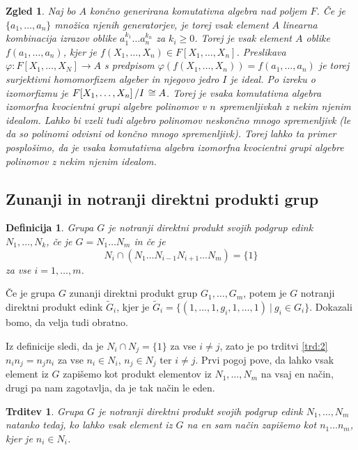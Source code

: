\documentclass[10pt, a4paper]{article}
\newtheorem{trditev}[izr]{Trditev}
\newtheorem{defi}{Definicija}[section]
\newenvironment{noticeB}{%
  \tcolorbox[%
  notitle,
  empty,
  enhanced,  %
  breakable,
  coltext=black,
  colback=white, 
  fontupper=\rmfamily,
  noparskip,
  sharp corners,
  boxrule=-1pt,  %
  frame hidden,
  left=7pt,  %
  right=7pt,
  top=5pt,
  bottom=5pt,
  before skip=2.5ex plus 2pt,
  after skip=2.5ex plus 2pt,
  borderline west = {1.5pt}{-0.1pt}{blue!30!black}, %
  overlay unbroken and last={%
    \draw[color=black, line width=1.25pt]
    ($(frame.south west)+(1.pt, -0.1pt)$) -- ++(2em, 0);
  }
  ]}
{\endtcolorbox}
\newenvironment{definicija}{\begin{noticeB}\begin{defi}}{%
    \end{defi}\end{noticeB}}
\newtheorem{zgled}{Zgled}[section]
\newcommand{\quot}[2]{{\raisebox{0em}{$#1$}\left/\raisebox{0em}{$#2$}\right.}}
\begin{document}
\begin{zgled}
  Naj bo $A$ končno generirana komutativna algebra nad poljem $F$.
  Če je $\{a_1, \dots, a_n\}$ množica njenih generatorjev, je torej 
  vsak element $A$ linearna kombinacija izrazov oblike $a_1 ^{k_1} \dots a_n^{k_n}$ za 
  $k_i \geq 0$. Torej je vsak element $A$ oblike $f(a_1, \dots, a_n)$,
  kjer je $f(X_1, \dots, X_n) \in F[X_1, \dots, X_n]$.
  Preslikava $\varphi: F[X_1, \dots, X_N] \to A$
  s predpisom $\varphi (f(X_1, \dots, X_n)) = f(a_1, \dots, a_n)$ je torej surjektivni homomorfizem algeber in 
  njegovo jedro $I$ je ideal.
  Po izreku o izomorfizmu je $\quot{F[X_1, \dots, X_n]}{I} \cong A$.
  Torej je vsaka komutativna algebra izomorfna kvocientni grupi algebre polinomov v $n$ spremenljivkah
  z nekim njenim idealom. Lahko bi vzeli tudi algebro polinomov neskončno mnogo spremenljivk 
  (le da so polinomi odvisni od končno mnogo spremenljivk).
  Torej lahko ta primer posplošimo, da je vsaka komutativna algebra izomorfna kvocientni grupi 
  algebre polinomov z nekim njenim idealom.
\end{zgled}

\subsection{Zunanji in notranji direktni produkti grup}

\begin{definicija}
  Grupa $G$ je notranji direktni produkt svojih podgrup
  edink $N_1, \dots, N_k$, če je $G = N_1 \dots N_m$ in če je 
  $$N_i \cap (N_1 \dots N_{i - 1} N_{i + 1} \dots N_m) = \{1\}$$
  za vse $i = 1, \dots, m$.
\end{definicija}

Če je grupa $G$ zunanji direktni produkt grup $G_1, \dots, G_m$, potem je $G$ notranji direktni produkt edink $\tilde{G}_i$,
kjer je $\tilde{G}_i = \{(1, \dots, 1, g_i, 1, \dots, 1)\ |\ g_i \in G_i\}$.
Dokazali bomo, da velja tudi obratno.

Iz definicije sledi, da je $N_i \cap N_j = \{1\}$ za vse $i \neq j$, zato je 
po trditvi \ref{trd:2} $n_i n_j = n_j n_i$ za vse $n_i \in N_i$, $n_j \in N_j$ ter $i \neq j$.
Prvi pogoj pove, da lahko vsak element iz $G$ zapišemo kot produkt elementov 
iz $N_1, \dots, N_m$ na vsaj en način, drugi pa nam zagotavlja, da je tak način le eden.

\begin{trditev}
  Grupa $G$ je notranji direktni produkt svojih podgrup edink $N_1, \dots, N_m$ 
  natanko tedaj, ko lahko vsak element iz $G$ na en sam način zapišemo kot $n_1 \dots n_m$,
  kjer je $n_i \in N_i$.
\end{trditev}
\end{document}

